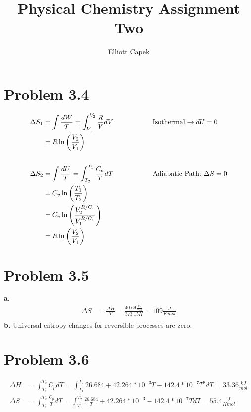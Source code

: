 \documentclass[10pt]{article} %
\title{Physical Chemistry Assignment Two}
\author{Elliott Capek}
\begin{document}
\maketitle{}

\section{Problem 3.4}

\begin{align*}
  \Delta S_1 &= \int \frac{dW}{T} = \int_{V_1}^{V_2} \frac{R}{V}dV
  \hspace{2cm} \mbox{Isothermal} \rightarrow dU = 0\\
  &= R\ln\left(\frac{V_2}{V_1}\right)\\
  \vspace{1cm}\\
  \Delta S_2 &= \int \frac{dU}{T} = \int_{T_2}^{T_1} \frac{C_v}{T}dT
  \hspace{2cm} \mbox{Adiabatic Path: } \Delta S = 0\\
  &= C_v\ln\left(\frac{T_1}{T_2}\right)\\
  &= C_v\ln\left(\frac{V_2^{R/C_v}}{V_1^{R/C_v}}\right)\\
  &= R\ln\left(\frac{V_2}{V_1}\right)\\
\end{align*}

\section{Problem 3.5}
\textbf{a.}
\begin{align*}
  \Delta S &= \frac{\Delta H}{T} = \frac{40.69 \frac{kJ}{mol}}{373.15K} = 109 \frac{J}{K mol}\\
\end{align*}
\textbf{b.}
Universal entropy changes for reversible processes are zero.\\

\section{Problem 3.6}
\begin{align*}
  \Delta H &= \int_{T_1}^{T_2} C_p dT = \int_{T_1}^{T_2} 26.684 + 42.264*10^{-3}T - 142.4*10^{-7}T^2 dT = 33.36 \frac{kJ}{mol}\\
  \Delta S &= \int_{T_1}^{T_2} \frac{C_p}{T} dT = \int_{T_1}^{T_2} \frac{26.684}{T} + 42.264*10^{-3} - 142.4*10^{-7}T dT = 55.4 \frac{J}{K mol}\\
\end{align*}
\end{document}
